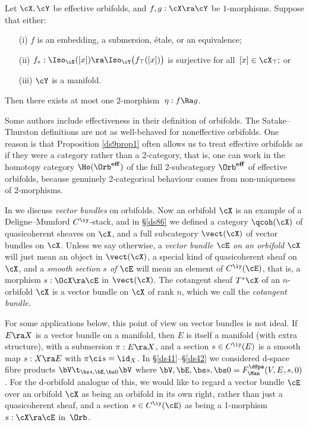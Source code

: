 \documentclass{article}
\begin{document}
\begin{prop} Let\/ $\cX,\cY$ be effective orbifolds, and\/
$f,g:\cX\ra\cY$ be $1$-morphisms. Suppose that either:
\begin{itemize}
\setlength{\itemsep}{0pt}
\setlength{\parsep}{0pt}
\item[{\rm(i)}] $f$ is an embedding, a submersion, \'etale, or an
equivalence;
\item[{\rm(ii)}] $f_*:\Iso_\cX([x])\ra\Iso_\cY\bigl(f_\top([x])\bigr)$
is surjective for all\/~$[x]\in\cX_\top;$ or
\item[{\rm(iii)}] $\cY$ is a manifold.
\end{itemize}
Then there exists at most one $2$-morphism\/~$\eta:f\Ra g$.
\label{ds9prop1}
\end{prop}

Some authors include effectiveness in their definition of orbifolds.
The Satake--Thurston definitions are not as well-behaved for
noneffective orbifolds. One reason is that Proposition
\ref{ds9prop1} often allows us to treat effective orbifolds as if
they were a category rather than a 2-category, that is, one can work
in the homotopy category $\Ho(\Orb^{\bf eff})$ of the full 2-subcategory $\Orb^{\bf
eff}$ of effective orbifolds, because genuinely 2-categorical
behaviour comes from non-uniqueness of
2-morphisms.

In \cite[\S 8.3]{Joyc6} we discuss {\it vector bundles\/} on
orbifolds. Now an orbifold $\cX$ is an
example of a Deligne--Mumford $C^\iy$-stack, and in \S\ref{ds86} we
defined a category $\qcoh(\cX)$ of quasicoherent sheaves on $\cX$,
and a full subcategory $\vect(\cX)$ of vector bundles on $\cX$.
Unless we say otherwise, a {\it vector bundle $\cE$ on an
orbifold\/} $\cX$ will just mean an object in $\vect(\cX)$, a
special kind of quasicoherent sheaf on $\cX$, and a {\it smooth
section\/ $s$ of\/} $\cE$ will mean an element of $C^\iy(\cE)$, that
is, a morphism $s:\OcX\ra\cE$ in $\vect(\cX)$. The cotangent sheaf
$T^*\cX$ of an $n$-orbifold $\cX$ is a vector bundle on $\cX$ of
rank $n$, which we call the {\it cotangent
bundle}.

For some applications below, this point of view on vector bundles is
not ideal. If $E\ra X$ is a vector bundle on a manifold, then $E$ is
itself a manifold (with extra structure), with a submersion
$\pi:E\ra X$, and a section $s\in C^\iy(E)$ is a smooth map $s:X\ra
E$ with $\pi\ci s=\id_X$. In \S\ref{ds41}--\S\ref{ds42} we
considered d-space fibre products $\bV\t_{\bs s,\bE,\bs 0}\bV$ where
$\bV,\bE,\bs s,\bs 0=F_\Man^\dSpa(V,E,s,0)$. For the d-orbifold
analogue of this, we would like to regard a vector bundle $\cE$ over
an orbifold $\cX$ as being an orbifold in its own right, rather than
just a quasicoherent sheaf, and a section $s\in C^\iy(\cE)$ as being
a 1-morphism $s:\cX\ra\cE$ in~$\Orb$.
\end{document}
